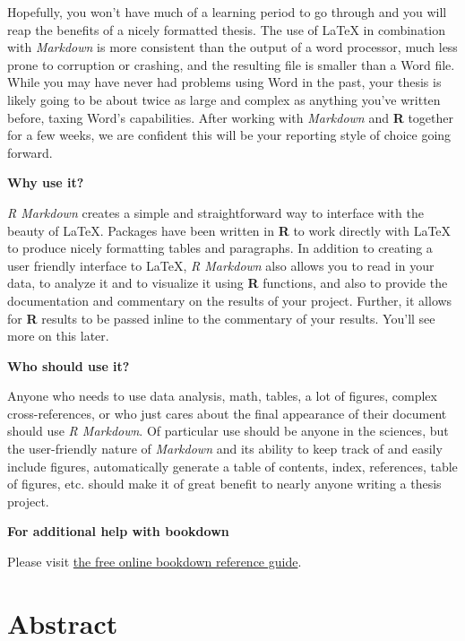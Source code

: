 \documentclass{sfuthesis}
\begin{document}
Hopefully, you won't have much of a learning period to go through and you will reap the benefits of a nicely formatted thesis. The use of LaTeX in combination with \emph{Markdown} is more consistent than the output of a word processor, much less prone to corruption or crashing, and the resulting file is smaller than a Word file. While you may have never had problems using Word in the past, your thesis is likely going to be about twice as large and complex as anything you've written before, taxing Word's capabilities. After working with \emph{Markdown} and \textbf{R} together for a few weeks, we are confident this will be your reporting style of choice going forward.

\textbf{Why use it?}

\emph{R Markdown} creates a simple and straightforward way to interface with the beauty of LaTeX. Packages have been written in \textbf{R} to work directly with LaTeX to produce nicely formatting tables and paragraphs. In addition to creating a user friendly interface to LaTeX, \emph{R Markdown} also allows you to read in your data, to analyze it and to visualize it using \textbf{R} functions, and also to provide the documentation and commentary on the results of your project. Further, it allows for \textbf{R} results to be passed inline to the commentary of your results. You'll see more on this later.

\textbf{Who should use it?}

Anyone who needs to use data analysis, math, tables, a lot of figures, complex cross-references, or who just cares about the final appearance of their document should use \emph{R Markdown}. Of particular use should be anyone in the sciences, but the user-friendly nature of \emph{Markdown} and its ability to keep track of and easily include figures, automatically generate a table of contents, index, references, table of figures, etc. should make it of great benefit to nearly anyone writing a thesis project.

\textbf{For additional help with bookdown}

Please visit \href{https://bookdown.org/yihui/bookdown/}{the free online bookdown reference guide}.

\hypertarget{abstract}{%
\section{Abstract}\label{abstract}}
\end{document}
